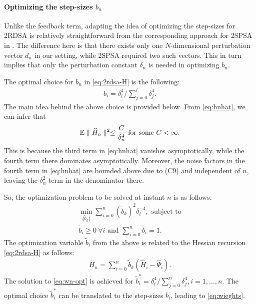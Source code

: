 \documentclass[letterpaper, 10 pt, conference]{ieeeconf}  %
\begin{document}
\paragraph{\textbf{Optimizing the step-sizes }$b_n$}
Unlike the feedback term, adapting the idea of optimizing the step-sizes for 2RDSA is relatively straightforward from the corresponding approach for 2SPSA in \cite{spall-jacobian}. The difference here is that there exists only one $N$-dimensional perturbation vector $d_n$ in our setting, while 2SPSA required two such vectors. This in turn implies that only the perturbation constant $\delta_n$ is needed in optimizing $b_n$.

The optimal choice for $b_n$ in \eqref{eq:2rdsa-H} is the following:
\begin{align}
\label{eq:wieghts}
b_i  = \delta_i^{4}/\sum\limits_{j=0}^{i} \delta_j^{4}.
\end{align}
The main idea behind the above choice is provided below.
From \eqref{eq:hnhat}, we can infer that
\begin{align*}
\mathbb{E} \parallel \widehat H_n \parallel^2 \le \dfrac{C}{\delta_n^4} \text{ for some } C<\infty. 
\end{align*} 
This is because the third term in \eqref{eq:hnhat} vanishes asymptotically, while the fourth term there dominates asymptotically. Moreover, the noise factors in the fourth term in \eqref{eq:hnhat} are bounded above due to (C9) and independent of $n$, leaving the $\delta_n^2$ term in the denominator there. 

So, the optimization problem to be solved at instant $n$ is as follows:
\begin{align}
\min_{ \{\tilde b_k\} } \sum \limits_{i=0}^{n} (\tilde b_k)^2 \delta_i^{-4}, \text{ subject to} \label{eq:wn-opt}\\
\tilde b_i \geq 0 ~\forall i \text{ and }\sum \limits_{i=0}^{n} \tilde b_i = 1.
\end{align}
The optimization variable $\tilde b_i$ from the above is related to the Hessian recursion \eqref{eq:2rdsa-H} as follows:
\begin{align}
\label{eq:hess}
\overline H_n = \sum\limits_{i=0}^{n} \tilde b_k(\widehat H_i -\widehat \Psi_i).
\end{align}
The solution to \eqref{eq:wn-opt} is achieved for $\tilde b_i^* = \delta_i^{4}/\sum \limits_{j=0}^{n} \delta_j^{4}, i=1,\ldots,n$. The optimal choice $\tilde b_i^*$ can be translated to the step-sizes $b_i$, leading to \eqref{eq:wieghts}.
\end{document}
